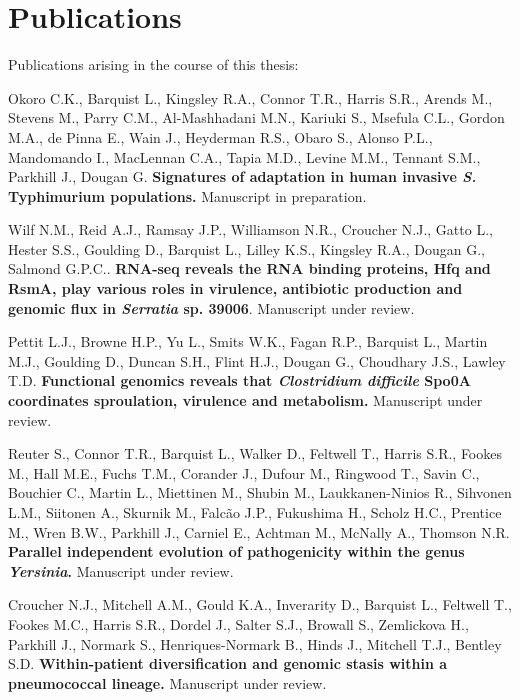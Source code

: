 \chapter{Publications}

Publications arising in the course of this thesis:

\itemize

\item{Okoro C.K., Barquist L., Kingsley R.A., Connor T.R., Harris S.R., Arends M., Stevens M., Parry C.M., Al-Mashhadani M.N., Kariuki S., Msefula C.L., Gordon M.A., de Pinna E., Wain J., Heyderman R.S., Obaro S., Alonso P.L., Mandomando I., MacLennan C.A., Tapia M.D., Levine M.M., Tennant S.M., Parkhill J., Dougan G.  \textbf{Signatures of adaptation in human invasive \textit{S.} Typhimurium populations.} Manuscript in preparation.} 

\item{Wilf N.M., Reid A.J., Ramsay J.P., Williamson N.R., Croucher N.J., Gatto L., Hester S.S., Goulding D., Barquist L., Lilley K.S., Kingsley R.A., Dougan G., Salmond G.P.C.. \textbf{RNA-seq reveals the RNA binding proteins, Hfq and RsmA, play various roles in virulence, antibiotic production and genomic flux in \textit{Serratia} sp. 39006}. Manuscript under review.}

\item{Pettit L.J., Browne H.P., Yu L., Smits W.K., Fagan R.P., Barquist L., Martin M.J., Goulding D., Duncan S.H., Flint H.J., Dougan G., Choudhary J.S., Lawley T.D. \textbf{Functional genomics reveals that \textit{Clostridium difficile} Spo0A coordinates sproulation, virulence and metabolism.} Manuscript under review.}

\item{Reuter S., Connor T.R., Barquist L., Walker D., Feltwell T., Harris S.R., Fookes M., Hall M.E., Fuchs T.M., Corander J., Dufour M., Ringwood T., Savin C., Bouchier C., Martin L., Miettinen M., Shubin M., Laukkanen-Ninios R., Sihvonen L.M., Siitonen A., Skurnik M., Falc\~{a}o J.P., Fukushima H., Scholz H.C., Prentice M., Wren B.W., Parkhill J., Carniel E., Achtman M., McNally A., Thomson N.R. \textbf{Parallel independent evolution of pathogenicity within the genus \textit{Yersinia}.} Manuscript under review.}

\newpage

\item{Croucher N.J., Mitchell A.M., Gould K.A., Inverarity D., Barquist L., Feltwell T., Fookes M.C., Harris S.R., Dordel J., Salter S.J., Browall S., Zemlickova H., Parkhill J., Normark S., Henriques-Normark B., Hinds J., Mitchell T.J., Bentley S.D. \textbf{Within-patient diversification and genomic stasis within a pneumococcal lineage.} Manuscript under review.} 

